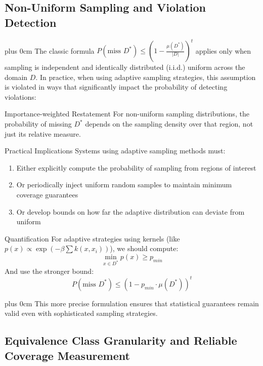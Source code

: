 \documentclass[conference]{IEEEtran}
\newcommand{\justifytext}{\leftskip=0pt \rightskip=0pt plus 0cm}
\begin{document}
\subsection{Non-Uniform Sampling and Violation Detection}

\justifytext
The classic formula $P(\text{miss } D^*) \leq \left(1 - \frac{\mu(D^*)}{|D|}\right)^t$ applies only when sampling is independent and identically distributed (i.i.d.) uniform across the domain $D$. In practice, when using adaptive sampling strategies, this assumption is violated in ways that significantly impact the probability of detecting violations:

\begin{alertbox}{Importance-weighted Restatement}
For non-uniform sampling distributions, the probability of missing $D^*$ depends on the sampling density over that region, not just its relative measure.
\end{alertbox}

\begin{alertbox}{Practical Implications}
Systems using adaptive sampling methods must:
\begin{enumerate}
\item Either explicitly compute the probability of sampling from regions of interest
\item Or periodically inject uniform random samples to maintain minimum coverage guarantees
\item Or develop bounds on how far the adaptive distribution can deviate from uniform
\end{enumerate}
\end{alertbox}

\begin{alertbox}{Quantification}
For adaptive strategies using kernels (like $p(x) \propto \exp(-\beta \sum k(x, x_i))$), we should compute:
\begin{equation}
\min_{x \in D^*} p(x) \geq p_{min}
\end{equation}
And use the stronger bound:
\begin{equation}
P(\text{miss } D^*) \leq (1 - p_{min} \cdot \mu(D^*))^t
\end{equation}
\end{alertbox}

\justifytext
This more precise formulation ensures that statistical guarantees remain valid even with sophisticated sampling strategies.

\subsection{Equivalence Class Granularity and Reliable Coverage Measurement}
\end{document}
